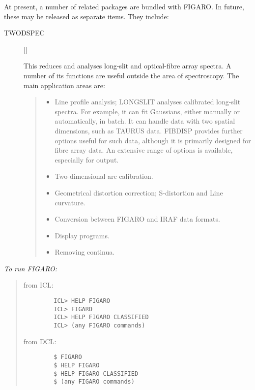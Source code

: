 At present, a number of related packages are bundled with FIGARO.
In future, these may be released as separate items.
They include:
\begin{description}

\item [TWODSPEC] \hfill []

This reduces and analyses long-slit and optical-fibre array spectra.
A number of its functions are useful outside the area of spectroscopy.
The main application areas are:

{\small
\begin{quote}
\begin{itemize}

\item Line profile analysis; LONGSLIT analyses calibrated long-slit spectra.
For example, it can fit Gaussians, either manually or automatically, in batch.
It can handle data with two spatial dimensions, such as TAURUS data.
\mbox{FIBDISP} provides further options useful for such data, although it is
primarily designed for fibre array data.
An extensive range of options is available, especially for output.
\item Two-dimensional arc calibration.
\item Geometrical distortion correction; S-distortion and Line curvature.
\item Conversion between FIGARO and IRAF data formats.
\item Display programs.
\item Removing continua.
\end{itemize}
\end{quote}
}

\end{description}

{\em To run FIGARO:}\hfill
\begin{quote}
\begin{description}

\item [from ICL:]\hfill

\begin{small}
\begin{verbatim}
   ICL> HELP FIGARO
   ICL> FIGARO
   ICL> HELP FIGARO CLASSIFIED
   ICL> (any FIGARO commands)
\end{verbatim}
\end{small}

\item [from DCL:]\hfill

\begin{small}
\begin{verbatim}
   $ FIGARO
   $ HELP FIGARO
   $ HELP FIGARO CLASSIFIED
   $ (any FIGARO commands)
\end{verbatim}
\end{small}

\end{description}
\end{quote}

